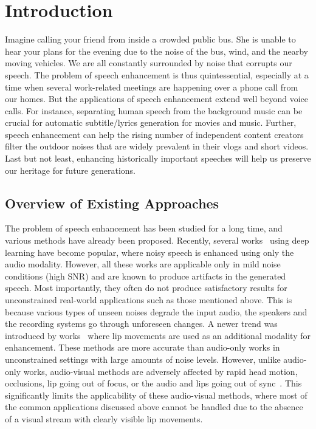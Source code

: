 \documentclass[10pt,twocolumn,letterpaper]{article}
\begin{document}
\section{Introduction}
\label{section:introduction}

Imagine calling your friend from inside a crowded public bus. She is unable to hear your plans for the evening due to the noise of the bus, wind, and the nearby moving vehicles. We are all constantly surrounded by noise that corrupts our speech. The problem of speech enhancement is thus quintessential, especially at a time when several work-related meetings are happening over a phone call from our homes. But the applications of speech enhancement extend well beyond voice calls. For instance, separating human speech from the background music can be crucial for automatic subtitle/lyrics generation for movies and music. Further, speech enhancement can help the rising number of independent content creators filter the outdoor noises that are widely prevalent in their vlogs and short videos. Last but not least, enhancing historically important speeches will help us preserve our heritage for future generations.

\subsection{Overview of Existing Approaches}
The problem of speech enhancement has been studied for a long time, and various methods have already been proposed. Recently, several works~\cite{8461944,segan,Germain2019SpeechDW} using deep learning have become popular, where noisy speech is enhanced using only the audio modality. However, all these works are applicable only in mild noise conditions (high SNR) and are known to produce artifacts in the generated speech. Most importantly, they often do not produce satisfactory results for unconstrained real-world applications such as those mentioned above. This is because various types of unseen noises degrade the input audio, the speakers and the recording systems go through unforeseen changes. A newer trend was introduced by works~\cite{cocktailparty_erphat_2018,TheConversation_Afouras_2018} where lip movements are used as an additional modality for enhancement. These methods are more accurate than audio-only works in unconstrained settings with large amounts of noise levels. However, unlike audio-only works, audio-visual methods are adversely affected by rapid head motion, occlusions, lip going out of focus, or the audio and lips going out of sync~\cite{TheConversation_Afouras_2018}. This significantly limits the applicability of these audio-visual methods, where most of the common applications discussed above cannot be handled due to the absence of a visual stream with clearly visible lip movements. 
\end{document}
